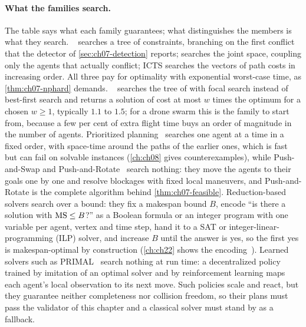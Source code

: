 \paragraph{What the families search.}
The table says what each family guarantees; what distinguishes the members
is what they search. \cbs~\cite{sharon2015cbs}
searches a tree of constraints, branching on the first conflict that the
detector of \cref{sec:ch07-detection} reports; \mstar searches the joint
space, coupling only the agents that actually conflict; ICTS
searches the vectors of path costs in increasing order. All three pay for optimality with exponential worst-case
time, as \cref{thm:ch07-nphard} demands. \ecbs~\cite{barer2014ecbs} searches
the tree of \cbs with focal search instead of best-first search and returns a
solution of cost at most $w$ times the optimum for a chosen $w \ge 1$,
typically $1.1$ to $1.5$; for a drone swarm this is the family to start from,
because a few per cent of extra flight time buys an order of magnitude in the
number of agents. Prioritized
planning~\cite{silver2005cooperative} searches one
agent at a time in a fixed order, with space-time \astar around the paths of
the earlier ones, which is fast but can fail on solvable instances
(\cref{ch:ch08} gives counterexamples), while Push-and-Swap and
Push-and-Rotate~\cite{luna2011push,dewilde2014push}
search nothing: they move the agents to their goals one by one and resolve
blockages with fixed local maneuvers, and Push-and-Rotate is the complete
algorithm behind \cref{thm:ch07-feasible}. Reduction-based solvers search
over a bound: they fix a makespan bound $B$, encode ``is there a solution
with $\mathrm{MS} \le B$?'' as a Boolean formula or an integer program with one
variable per agent, vertex and time step, hand it to a SAT or
integer-linear-programming (ILP) solver, and increase $B$ until the answer is
yes, so the first yes is makespan-optimal by construction
(\cref{ch:ch22} shows the encoding~\cite{yu2016optimal}). Learned solvers
such as PRIMAL~\cite{sartoretti2019primal} search nothing at run time: a
decentralized policy trained by imitation of an optimal solver and by
reinforcement learning maps each agent's local observation to its next move.
Such policies scale and react, but they guarantee neither completeness nor
collision freedom, so their plans must pass the validator of this chapter and
a classical solver must stand by as a fallback.

